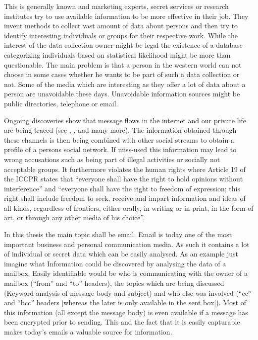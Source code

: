 \documentclass[twocolumn,a4paper,10pt,english]{scrartcl}
\begin{document}
This is generally known and marketing experts, secret services or research institutes try to use available information to be more effective in their job. They invent methods to collect vast amount of data about persons and then try to identify interesting individuals or groups for their respective work. While the interest of the data collection owner might be legal the existence of a database categorizing individuals based on statistical likelihood might be more than questionable. The main problem is that a person in the western world can not choose in some cases whether he wants to be part of such a data collection or not. Some of the media which are interesting as they offer a lot of data about a person are unavoidable these days. Unavoidable information sources might be public directories, telephone or email.\par

Ongoing discoveries show that message flows in the internet and our private life are being traced (see \cite{ECHELON}, \cite{wiki:prism}, \cite{wiki:tempora} and many more). The information obtained through these channels is then being combined with other social streams to obtain a profile of a persons social network. If miss-used this information may lead to wrong accusations such as being part of illegal activities or socially not acceptable groups. It furthermore violates the human rights where Article 19 of the ICCPR states that ``everyone shall have the right to hold opinions without interference'' and ``everyone shall have the right to freedom of expression; this right shall include freedom to seek, receive and impart information and ideas of all kinds, regardless of frontiers, either orally, in writing or in print, in the form of art, or through any other media of his choice''\cite{iccpr}.\par

In this thesis the main topic shall be email. Email is today one of the most important business and personal communication media. As such it contains a lot of individual or secret data which can be easily analysed. As an example just imagine what Information could be discovered by analysing the data of a mailbox. Easily identifiable would be who is communicating with the owner of a mailbox (``from'' and ``to'' headers), the topics which are being discussed (Keyword analysis of message body and subject) and who else was involved (``cc'' and ``bcc'' headers [whereas the later is only available in the sent box]). Most of this information (all except the message body) is even available if a message has been encrypted prior to sending. This and the fact that it is easily capturable makes today’s emails a valuable source for information.\par
\end{document}
